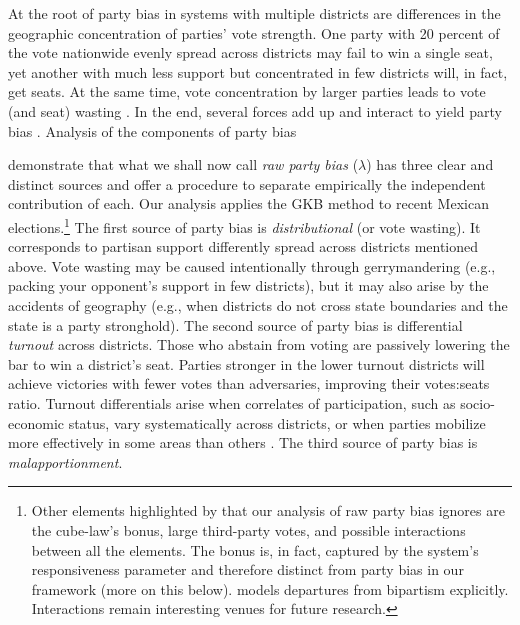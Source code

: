 \documentclass[letter,12pt]{article}
\begin{document}
At the root of party bias in systems with multiple districts are differences in the geographic concentration of parties' vote strength. One party with 20 percent of the vote nationwide evenly spread across districts may fail to win a single seat, yet another with much less support but concentrated in few districts will, in fact, get seats. At the same time, vote concentration by larger parties leads to vote (and seat) wasting \citep{calvo.roddenMultipartyPlurality2015}. In the end, several forces add up and interact to yield party bias \citep{gudgin.taylor.1980decomposeBias}. Analysis of the components of party bias 

\citet{grofman.etalBiasMalapp.1997} demonstrate that what we shall now call \emph{raw party bias} ($\lambda$) has three clear and distinct sources and offer a procedure to separate empirically the independent contribution of each. Our analysis applies the GKB method to recent Mexican elections.\footnote{Other elements highlighted by \citet{gudgin.taylor.1980decomposeBias} that our analysis of raw party bias ignores are the cube-law's bonus, large third-party votes, and possible interactions between all the elements. The bonus is, in fact, captured by the system's responsiveness parameter and therefore distinct from party bias in our framework (more on this below). \citet{calvo.2009roadToPR} models departures from bipartism explicitly. Interactions remain interesting venues for future research.} The first source of party bias is \emph{distributional} (or vote wasting). It corresponds to partisan support differently spread across districts mentioned above. Vote wasting may be caused intentionally through gerrymandering (e.g., packing your opponent's support in few districts), but it may also arise by the accidents of geography (e.g., when districts do not cross state boundaries and the state is a party stronghold). The second source of party bias is differential \emph{turnout} across districts. Those who abstain from voting are passively lowering the bar to win a district's seat. Parties stronger in the lower turnout districts will achieve victories with fewer votes than adversaries, improving their votes:seats ratio. Turnout differentials arise when correlates of participation, such as socio-economic status, vary systematically across districts, or when parties mobilize more effectively in some areas than others \citep{rosenstone.hansen.1993}. The third source of party bias is \emph{malapportionment}. 
\end{document}

